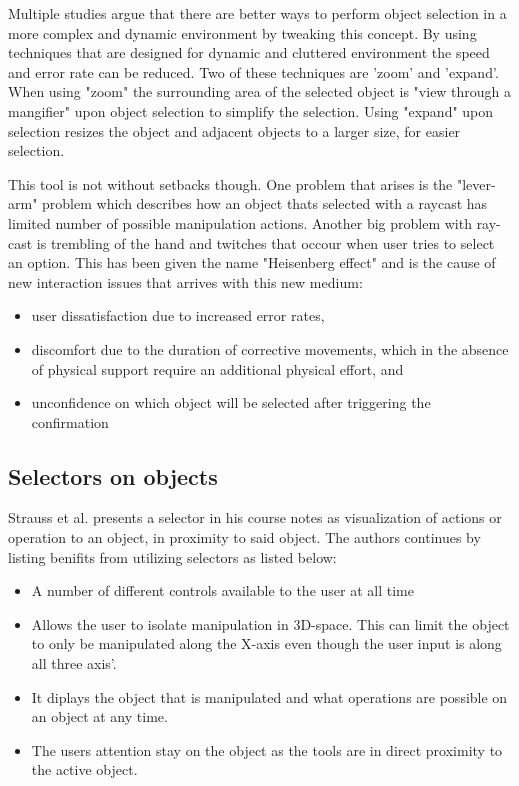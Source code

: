 Multiple studies argue that there are better ways to perform object selection in a more complex and dynamic environment by tweaking this concept\cite{selection:Argelaguet2008,interactions:Bowman1997}. By using techniques that are designed for dynamic and cluttered environment the speed and error rate can be reduced. Two of these techniques are 'zoom' and 'expand'. When using "zoom" the surrounding area of the selected object is "view through a mangifier" upon object selection to simplify the selection. Using "expand" upon selection resizes the object and adjacent objects to a larger size, for easier selection.

This tool is not without setbacks though. One problem that arises is the "lever-arm" problem which describes how an object thats selected with a raycast has limited number of possible manipulation actions\cite{interactions:Poupyrev1996}. Another big problem with ray-cast is trembling of the hand and twitches that occour when user tries to select an option. This has been given the name "Heisenberg effect" and is the cause of new interaction issues that arrives with this new medium\cite{selection:Bowman2001}:

\begin{itemize}
\item user dissatisfaction due to increased error rates,
\item discomfort due to the duration of corrective movements, which in the absence of physical support require an additional physical effort, and
\item unconfidence on which object will be selected after triggering the confirmation
\end{itemize}

\subsection{Selectors on objects}
\label{theory:toolsandtech:selector}
Strauss et al. presents a selector in his course notes\cite{tools:strauss2002design} as visualization of actions or operation to an object, in proximity to said object. The authors continues by listing benifits from utilizing selectors as listed below:
\begin{itemize}
  \item A number of different controls available to the user at all time
  \item Allows the user to isolate manipulation in 3D-space. This can limit the object to only be manipulated along the X-axis even though the user input is along all three axis'.
  \item It diplays the object that is manipulated and what operations are possible on an object at any time.
  \item The users attention stay on the object as the tools are in direct proximity to the active object.

\end{itemize}

